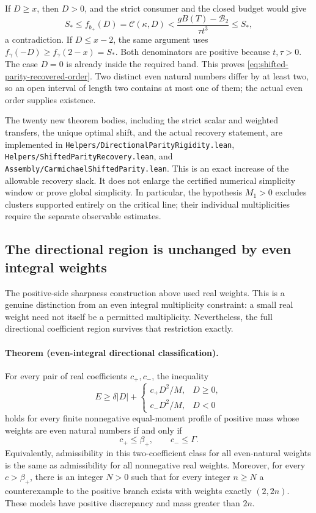 If \(D\ge x\), then \(D>0\), and the strict consumer and the closed
budget would give
\[
 S_*\le f_{b_+}(D)=\mathcal C(\kappa,D)
 <\frac{gB(T)-\mathcal B_2}{\tau t^3}\le S_*,
\]
a contradiction.  If \(D\le x-2\), the same argument uses
\(f_\gamma(-D)\ge f_\gamma(2-x)=S_*\).  Both denominators are positive
because \(t,\tau>0\).  The case \(D=0\) is already inside the required
band.  This proves \eqref{eq:shifted-parity-recovered-order}.  Two distinct
even natural numbers differ by at least two, so an open interval of length
two contains at most one of them; the actual even order supplies existence.

The twenty new theorem bodies, including the strict scalar and weighted
transfers, the unique optimal shift, and the actual recovery statement, are
implemented in \texttt{Helpers/DirectionalParityRigidity.lean},
\texttt{Helpers/ShiftedParityRecovery.lean}, and
\texttt{Assembly/CarmichaelShiftedParity.lean}.  This is an exact increase
of the allowable recovery slack.  It does not enlarge the certified numerical
simplicity window or prove global simplicity.  In particular, the hypothesis
\(M_1>0\) excludes clusters supported entirely on the critical line; their
individual multiplicities require the separate observable estimates.

\subsection{The directional region is unchanged by even integral weights}
\label{sec:even-directional-region}

The positive-side sharpness construction above used real weights.  This is
a genuine distinction from an even integral multiplicity constraint: a
small real weight need not itself be a permitted multiplicity.  Nevertheless,
the full directional coefficient region survives that restriction exactly.

\paragraph{Theorem (even-integral directional classification).}
For every pair of real coefficients \(c_+,c_-\), the inequality
\begin{equation}
 E\ge \delta|D|+
 \begin{cases}c_+D^2/M,&D\ge0,\\c_-D^2/M,&D<0\end{cases}
 \label{eq:even-directional-classification-bound}
\end{equation}
holds for every finite nonnegative equal-moment profile of positive mass
whose weights are even natural numbers if and only if
\begin{equation}
 c_+\le\beta_+,\qquad c_-\le\Gamma.
 \label{eq:even-directional-classification-region}
\end{equation}
Equivalently, admissibility in this two-coefficient class for all even-natural
weights is the same as admissibility for all nonnegative real weights.
Moreover, for every \(c>\beta_+\), there is an integer \(N>0\) such that
for every integer \(n\ge N\) a counterexample to the positive branch exists
with weights exactly \((2,2n)\).  These models have positive discrepancy and
mass greater than \(2n\).


